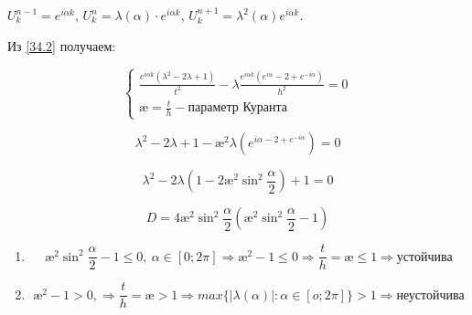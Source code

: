 \documentclass[__main__.tex]{subfiles}
\begin{document}
$U^{n-1}_k = e^{i \alpha k}$, $U^n_k = \lambda\left(\alpha\right) \cdot e^{i \alpha k}$, $U^{n+1}_k = \lambda^2 \left(\alpha\right) e^{i \alpha k}$.

Из \ref{34.2} получаем:

\begin{equation}
\begin{cases}
\frac{e^{i\alpha k} \left(\lambda^2 - 2 \lambda + 1\right)}{t^2} - \lambda \frac{e^{i \alpha k} \left(e^{i\alpha} - 2 + e^{-i\alpha}\right)}{h^2} = 0 \\
\text{\ae} = \frac{t}{h} - \text{параметр Куранта}
\end{cases}
\end{equation}

$$
\lambda^2 - 2 \lambda + 1 - \text{\ae}^2 \lambda \left(e^{i\alpha - 2 + e^{-i \alpha}}\right) = 0
$$

$$
\lambda^2 - 2 \lambda \left( 1 - 2\text{\ae}^2 \sin^2 \frac{\alpha}{2} \right) + 1 = 0
$$

$$
D = 4 \text{\ae}^2 \sin^2 \frac{\alpha}{2} \left(\text{\ae}^2 \sin^2 \frac{\alpha}{2} - 1 \right)
$$

\begin{enumerate}
	\item 
	$$
	\text{\ae}^2 \sin^2 \frac{\alpha}{2} - 1 \leq 0, \ \alpha \in [0;2\pi] \Rightarrow \text{\ae}^2 - 1 \leq 0 \Rightarrow \frac{t}{h} = \text{\ae} \leq 1 \Rightarrow \text{устойчива}
	$$
	
	\item 
	$$
	\text{\ae}^2 - 1 > 0, \Rightarrow \frac{t}{h} = \text{\ae} > 1 \Rightarrow max \{ \left|\lambda \left(\alpha\right)\right|: \alpha \in[o;2\pi] \} > 1 \Rightarrow \text{неустойчива}
	$$
\end{enumerate}
\end{document}
